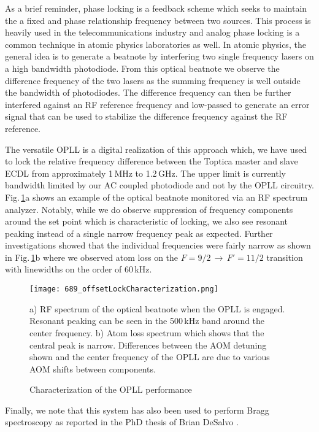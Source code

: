 As a brief reminder, phase locking is a feedback scheme which seeks to maintain the a fixed and phase relationship frequency between two sources.
This process is heavily used in the telecommunications industry and analog phase locking is a common technique in atomic physics laboratories as well.
In atomic physics, the general idea is to generate a beatnote by interfering two single frequency lasers on a high bandwidth photodiode.
From this optical beatnote we observe the difference frequency of the two lasers as the summing frequency is well outside the bandwidth of photodiodes.
The difference frequency can then be further interfered against an RF reference frequency and low-passed to generate an error signal that can be used to stabilize the difference frequency against the RF reference.

The versatile OPLL is a digital realization of this approach which, we have used to lock the relative frequency difference between the Toptica master and slave ECDL from approximately 1\,MHz to 1.2\,GHz.
The upper limit is currently bandwidth limited by our AC coupled photodiode and not by the OPLL circuitry.
Fig.\,\ref{fig:offsetDetails}a shows an example of the optical beatnote monitored via an RF spectrum analyzer.
Notably, while we do observe suppression of frequency components around the set point which is characteristic of locking, we also see resonant peaking instead of a single narrow frequency peak as expected.
Further investigations showed that the individual frequencies were fairly narrow as shown in Fig.\,\ref{fig:offsetDetails}b where we observed atom loss on the $F=9/2\,\rightarrow\,F'=11/2$ transition with linewidths on the order of 60\,kHz.
	\begin{figure}
	\centerline{
		\texttt{[image: 689\_offsetLockCharacterization.png]}}
		\caption{Characterization of the OPLL performance}{a) RF spectrum of the optical beatnote when the OPLL is engaged. Resonant peaking can be seen in the 500\,kHz band around the center frequency. b) Atom loss spectrum which shows that the central peak is narrow. Differences between the AOM detuning shown and the center frequency of the OPLL are due to various AOM shifts between components.}
		 \label{fig:offsetDetails}
	\end{figure}

Finally, we note that this system has also been used to perform Bragg spectroscopy as reported in the PhD thesis of Brian DeSalvo \cite{DeSalvo2015Thesis}.


